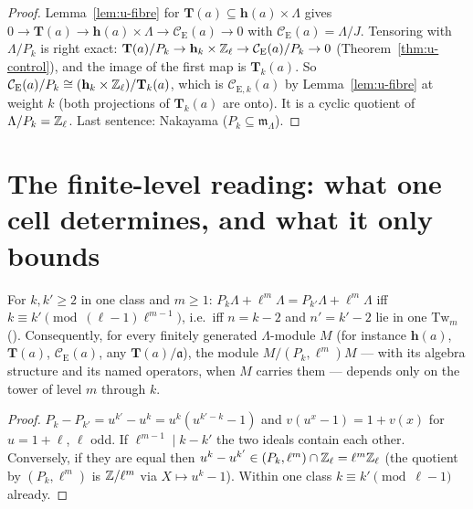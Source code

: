 \documentclass[11pt]{article}
\newcommand{\Iw}{\Lambda}                         %
\newcommand{\hcusp}{\mathbf{h}}                   %
\newcommand{\Tu}{\mathbf{T}}                      %
\newcommand{\Pk}[1]{P_{#1}}                       %
\newcommand{\Eis}{\mathrm{E}}
\newcommand{\Cg}{\mathcal{C}}                     %
\newcommand{\Zl}{\Z_\ell}
\begin{document}
\begin{proof}
Lemma~\ref{lem:u-fibre} for $\Tu(a)\subseteq\hcusp(a)\times\Iw$ gives $0\to\Tu(a)\to\hcusp(a)\times\Iw\to\Cg_\Eis(a)\to0$ with
$\Cg_\Eis(a)=\Iw/J$. Tensoring with $\Iw/\Pk{k}$ is right exact:
$\Tu(a)/\Pk{k}\to\hcusp_k\times\Zl\to\Cg_\Eis(a)/\Pk{k}\to0$ (Theorem~\ref{thm:u-control}), and the image of the first map is $\Tu_k(a)$.
So $\Cg_\Eis(a)/\Pk{k}\cong(\hcusp_k\times\Zl)/\Tu_k(a)$, which is $\Cg_{\Eis,k}(a)$ by Lemma~\ref{lem:u-fibre} at weight $k$ (both
projections of $\Tu_k(a)$ are onto). It is a cyclic quotient of $\Iw/\Pk{k}=\Zl$. Last sentence: Nakayama ($\Pk{k}\subseteq\mathfrak m_\Iw$).
\end{proof}

\section{The finite-level reading: what one cell determines, and what it only bounds}\label{sec:u-finite}

\begin{lemma}\label{lem:u-tower}
\PROVED{} For $k,k'\ge2$ in one class and $m\ge1$: $\Pk{k}\Iw+\ell^{m}\Iw=\Pk{k'}\Iw+\ell^{m}\Iw$ iff $k\equiv k'\pmod{(\ell-1)\ell^{m-1}}$,
i.e.\ iff $n=k-2$ and $n'=k'-2$ lie in one $\mathrm{Tw}_m$ (). Consequently, for every finitely generated
$\Iw$-module $M$ (for instance $\hcusp(a)$, $\Tu(a)$, $\Cg_\Eis(a)$, any $\Tu(a)/\mathfrak a$), the module $M/(\Pk{k},\ell^{m})M$ --- with
its algebra structure and its named operators, when $M$ carries them --- depends only on the tower of level $m$ through $k$.
\end{lemma}

\begin{proof}
$\Pk{k}-\Pk{k'}=u^{k'}-u^{k}=u^{k}(u^{k'-k}-1)$ and $v(u^{x}-1)=1+v(x)$ for $u=1+\ell$, $\ell$ odd. If $\ell^{m-1}\mid k-k'$ the two
ideals contain each other. Conversely, if they are equal then $u^{k}-u^{k'}\in(\Pk{k},\ell^{m})\cap\Zl=\ell^{m}\Zl$ (the quotient by
$(\Pk{k},\ell^{m})$ is $\mathbb{Z}/\ell^{m}$ via $X\mapsto u^{k}-1$). Within one class $k\equiv k'\pmod{\ell-1}$ already.
\end{proof}
\end{document}
